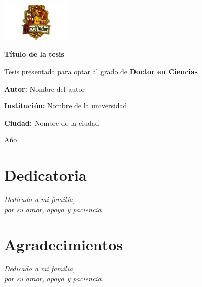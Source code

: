 \documentclass[12pt,oneside]{book}
\begin{document}
	
	\begin{titlepage}
		\begin{center}
			\includegraphics[width=0.25\textwidth]{logo.png}
			
			\vspace*{2cm}
			{\huge \textbf{Título de la tesis}}
			
			\vspace{1cm}
			{\Large Tesis presentada para optar al grado de \textbf{Doctor en Ciencias}}
			
			\vspace{2cm}
			{\Large \textbf{Autor:} Nombre del autor}
			
			\vspace{1cm}
			{\Large \textbf{Institución:} Nombre de la universidad}
			
			\vspace{1cm}
			{\Large \textbf{Ciudad:} Nombre de la ciudad}
			
			\vspace{1cm}
			{\Large Año}
		\end{center}
	\end{titlepage}
	
	\newpage
	\thispagestyle{empty}
	\mbox{}
	
	\chapter*{Dedicatoria}
	\begin{flushright}
		\textit{Dedicado a mi familia,\\
			por su amor, apoyo y paciencia.}
	\end{flushright}
	
	\chapter*{Agradecimientos}
	\begin{flushright}
		\textit{Dedicado a mi familia,\\
			por su amor, apoyo y paciencia.}
	\end{flushright}
\end{document}
